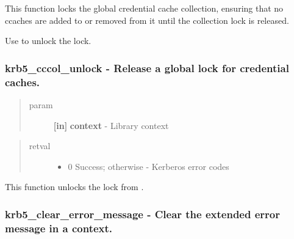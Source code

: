 \documentclass[letterpaper,10pt,english]{sphinxmanual}
\begin{document}
This function locks the global credential cache collection, ensuring that no ccaches are added to or removed from it until the collection lock is released.

Use {\hyperref[appdev/refs/api/krb5_cccol_unlock:krb5_cccol_unlock]{}} to unlock the lock.


\subsubsection{krb5\_cccol\_unlock -  Release a global lock for credential caches.}
\label{appdev/refs/api/krb5_cccol_unlock:krb5-cccol-unlock-release-a-global-lock-for-credential-caches}\label{appdev/refs/api/krb5_cccol_unlock::doc}

\begin{fulllineitems}
\label{appdev/refs/api/krb5_cccol_unlock:krb5_cccol_unlock}
\end{fulllineitems}

\begin{quote}\begin{description}
\item[{param}] \leavevmode
\textbf{{[}in{]}} \textbf{context} - Library context

\end{description}\end{quote}
\begin{quote}\begin{description}
\item[{retval}] \leavevmode\begin{itemize}
\item {} 
0   Success; otherwise - Kerberos error codes

\end{itemize}

\end{description}\end{quote}

This function unlocks the lock from {\hyperref[appdev/refs/api/krb5_cccol_lock:krb5_cccol_lock]{}} .


\subsubsection{krb5\_clear\_error\_message -  Clear the extended error message in a context.}
\label{appdev/refs/api/krb5_clear_error_message:krb5-clear-error-message-clear-the-extended-error-message-in-a-context}\label{appdev/refs/api/krb5_clear_error_message::doc}
\end{document}
